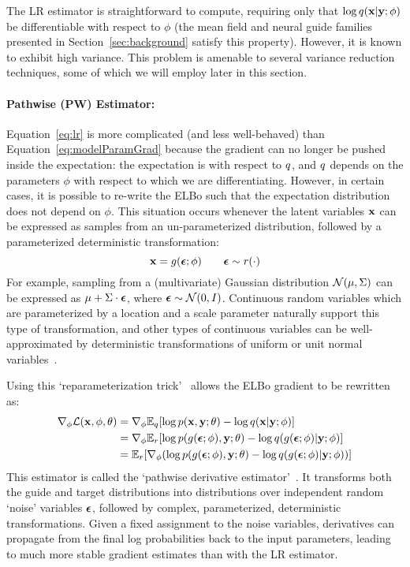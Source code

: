 The LR estimator is straightforward to compute, requiring only that $\log q(\mathbf{x} | \mathbf{y} ; \phi)$ be differentiable with respect to $\phi$ (the mean field and neural guide families presented in Section~\ref{sec:background} satisfy this property). However, it is known to exhibit high variance. This problem is amenable to several variance reduction techniques, some of which we will employ later in this section.

\paragraph{Pathwise (PW) Estimator:}

Equation~\ref{eq:lr} is more complicated (and less well-behaved) than Equation~\ref{eq:modelParamGrad} because the gradient can no longer be pushed inside the expectation: the expectation is with respect to $q$, and $q$ depends on the parameters $\phi$ with respect to which we are differentiating.
However, in certain cases, it is possible to re-write the ELBo such that the expectation distribution does not depend on $\phi$.
This situation occurs whenever the latent variables $\mathbf{x}$ can be expressed as samples from an un-parameterized distribution, followed by a parameterized deterministic transformation:
\begin{equation*}
\mathbf{x} = g(\bm{\epsilon} ; \phi) \hspace{2em} \bm{\epsilon} \sim r(\cdot)
\end{equation*}
For example, sampling from a (multivariate) Gaussian distribution $\mathcal{N}(\mu, \Sigma)$ can be expressed as $\mu + \Sigma \cdot \bm{\epsilon}$, where $\bm{\epsilon} \sim \mathcal{N}(0, I)$. Continuous random variables which are parameterized by a location and a scale parameter naturally support this type of transformation, and other types of continuous variables can be well-approximated by deterministic transformations of uniform or unit normal variables~\cite{ADVI}.

Using this `reparameterization trick'~\cite{AEVB} allows the ELBo gradient to be rewritten as:
\begin{align}
\begin{split}
\nabla_\phi \mathcal{L}(\mathbf{x}, \phi, \theta)
&= \nabla_\phi \mathbb{E}_{q}[ \log p(\mathbf{x}, \mathbf{y}; \theta) - \log q(\mathbf{x} | \mathbf{y} ; \phi) ]\\
&= \nabla_\phi \mathbb{E}_{r} [ \log p(g(\bm{\epsilon} ; \phi), \mathbf{y} ; \theta) - \log q(g(\bm{\epsilon} ; \phi) | \mathbf{y} ; \phi) ]\\
&= \mathbb{E}_{r} [\nabla_\phi ( \log p(g(\bm{\epsilon} ; \phi), \mathbf{y} ; \theta) - \log q(g(\bm{\epsilon} ; \phi) | \mathbf{y} ; \phi) ) ]
\end{split}
\label{eq:pw}
\end{align}
This estimator is called the `pathwise derivative estimator'~\cite{PathwiseEstimator}.
It transforms both the guide and target distributions into distributions over independent random `noise' variables $\bm{\epsilon}$, followed by complex, parameterized, deterministic transformations. Given a fixed assignment to the noise variables, derivatives can propagate from the final log probabilities back to the input parameters, leading to much more stable gradient estimates than with the LR estimator.

